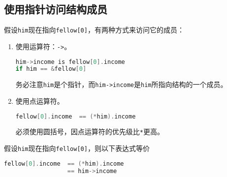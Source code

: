 \subsection{使用指针访问结构成员}
\begin{frame}[fragile]\ft{\subsecname}
假设\verb|him|现在指向\verb|fellow[0]|，有两种方式来访问它的成员：
\begin{enumerate}
\item 使用运算符：\verb|->|。
    \begin{lstlisting}[language=c,backgroundcolor=\color{red!20}]
him->income is fellow[0].income 
if him == &fellow[0]
    \end{lstlisting}
务必注意\verb|him|是个指针，而\verb|him->income|是\verb|him|所指向结构的一个成员。
\item 使用点运算符。
      \begin{lstlisting}[language=c,backgroundcolor=\color{red!20}]
fellow[0].income  == (*him).income
    \end{lstlisting}
必须使用圆括号，因点运算符的优先级比\verb|*|更高。
\end{enumerate}
\end{frame}

\begin{frame}[fragile]\ft{\subsecname}
假设\verb|him|现在指向\verb|fellow[0]|，则以下表达式等价
\begin{lstlisting}[language=c,backgroundcolor=\color{red!20}]
fellow[0].income  == (*him).income 
                  == him->income
\end{lstlisting}
\end{frame}
